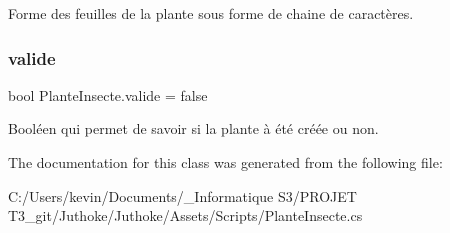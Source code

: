 Forme des feuilles de la plante sous forme de chaine de caractères. \mbox{\label{class_plante_insecte_a878195ddae623019386962c0bc59e9fa}} 
\subsubsection{\texorpdfstring{valide}{valide}}
{\footnotesize\ttfamily bool Plante\+Insecte.\+valide = false}

Booléen qui permet de savoir si la plante à été créée ou non. 

The documentation for this class was generated from the following file\+:\begin{DoxyCompactItemize}
\item 
C\+:/\+Users/kevin/\+Documents/\+\_\+\+Informatique S3/\+P\+R\+O\+J\+E\+T T3\+\_\+git/\+Juthoke/\+Juthoke/\+Assets/\+Scripts/Plante\+Insecte.\+cs\end{DoxyCompactItemize}

